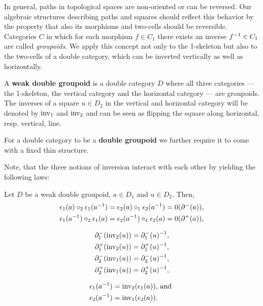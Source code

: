 In general, paths in topological spaces are non-oriented or can be reversed.
Our algebraic structures describing paths and squares should reflect this behavior
by the property that also its morphisms and two-cells should be reversible.
Categories $C$ in which for each morphism $f \in C_1$ there exists an inverse
$f^{-1} \in C_1$ are called \emph{groupoids}. We apply this concept not only
to the 1-skeleton but also to the two-cells of a
double category, which can be inverted vertically as well as horizontally.

\begin{defn} \label{def:weak-dbl-gpd}
A \textbf{weak double groupoid} is a double category $D$ where all three categories
--- the 1-skeleton, the vertical category and the horizontal category --- are
groupoids. The inverses of a square $u \in D_2$ in the vertical and horizontal category 
will be denoted by $\operatorname{inv_1}$ and $\operatorname{inv_2}$ and can be seen as flipping the square
along horizontal, resp. vertical, line.

For a double category to be a \textbf{double groupoid} we further require it to
come with a fixed thin structure.
\end{defn}

Note, that the three notions of inversion interact with each other by yielding
the following laws:

\begin{lemma} \label{thm:dbl-gpd-inv}
Let $D$ be a weak double groupoid, $a \in D_1$ and $u \in D_2$. Then,
\begin{equation} \label{eq:inv-coherence1}
\begin{aligned}
\epsilon_1(a) \circ_2 \epsilon_1(a^{-1})
	&= \epsilon_2(a) \circ_1 \epsilon_2(a^{-1})
	= 0(\partial^-(a)) \text{,} \\
\epsilon_1(a^{-1}) \circ_2 \epsilon_1(a)
	&= \epsilon_2(a^{-1}) \circ_1 \epsilon_2(a)
	= 0(\partial^+(a)) \text{,}
\end{aligned}
\end{equation}

\begin{equation} \label{eq:inv-coherence2}
\begin{aligned}
\partial^-_1(\operatorname{inv_2}(u)) &= \partial^-_1(u)^{-1} \text{,} \\
\partial^+_1(\operatorname{inv_2}(u)) &= \partial^+_1(u)^{-1} \text{,} \\
\partial^-_2(\operatorname{inv_1}(u)) &= \partial^-_2(u)^{-1} \text{,} \\
\partial^+_2(\operatorname{inv_1}(u)) &= \partial^+_2(u)^{-1} \text{,}
\end{aligned}
\end{equation}

\begin{equation} \label{eq:inv-coherence3}
\begin{aligned}
\epsilon_1(a^{-1}) &= \operatorname{inv_2}(\epsilon_1(a)) \text{, and } \\
\epsilon_2(a^{-1}) &= \operatorname{inv_1}(\epsilon_2(a)) \text{.}
\end{aligned}
\end{equation}
\end{lemma}

